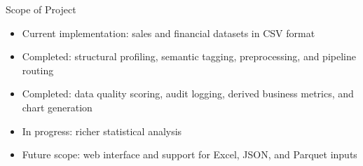 
\begin{frame}{Scope of Project}
    \begin{itemize}
        \item Current implementation: sales and financial datasets in CSV format
        \item Completed: structural profiling, semantic tagging, preprocessing, and pipeline routing
        \item Completed: data quality scoring, audit logging, derived business metrics, and chart generation
        \item In progress: richer statistical analysis
        \item Future scope: web interface and support for Excel, JSON, and Parquet inputs
    \end{itemize}
\end{frame}
